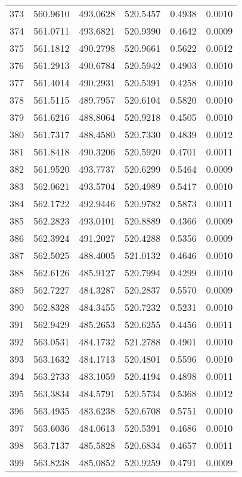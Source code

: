 \documentclass{article}
\begin{document}
\begin{longtable}{|c|c|c|c|c|c|}
373 & 560.9610 & 493.0628 & 520.5457 & 0.4938 & 0.0010 \\
374 & 561.0711 & 493.6821 & 520.9390 & 0.4642 & 0.0009 \\
375 & 561.1812 & 490.2798 & 520.9661 & 0.5622 & 0.0012 \\
376 & 561.2913 & 490.6784 & 520.5942 & 0.4903 & 0.0010 \\
377 & 561.4014 & 490.2931 & 520.5391 & 0.4258 & 0.0010 \\
378 & 561.5115 & 489.7957 & 520.6104 & 0.5820 & 0.0010 \\
379 & 561.6216 & 488.8064 & 520.9218 & 0.4505 & 0.0010 \\
380 & 561.7317 & 488.4580 & 520.7330 & 0.4839 & 0.0012 \\
381 & 561.8418 & 490.3206 & 520.5920 & 0.4701 & 0.0011 \\
382 & 561.9520 & 493.7737 & 520.6299 & 0.5464 & 0.0009 \\
383 & 562.0621 & 493.5704 & 520.4989 & 0.5417 & 0.0010 \\
384 & 562.1722 & 492.9446 & 520.9782 & 0.5873 & 0.0011 \\
385 & 562.2823 & 493.0101 & 520.8889 & 0.4366 & 0.0009 \\
386 & 562.3924 & 491.2027 & 520.4288 & 0.5356 & 0.0009 \\
387 & 562.5025 & 488.4005 & 521.0132 & 0.4646 & 0.0010 \\
388 & 562.6126 & 485.9127 & 520.7994 & 0.4299 & 0.0010 \\
389 & 562.7227 & 484.3287 & 520.2837 & 0.5570 & 0.0009 \\
390 & 562.8328 & 484.3455 & 520.7232 & 0.5231 & 0.0010 \\
391 & 562.9429 & 485.2653 & 520.6255 & 0.4456 & 0.0011 \\
392 & 563.0531 & 484.1732 & 521.2788 & 0.4901 & 0.0010 \\
393 & 563.1632 & 484.1713 & 520.4801 & 0.5596 & 0.0010 \\
394 & 563.2733 & 483.1059 & 520.4194 & 0.4898 & 0.0011 \\
395 & 563.3834 & 484.5791 & 520.5734 & 0.5368 & 0.0012 \\
396 & 563.4935 & 483.6238 & 520.6708 & 0.5751 & 0.0010 \\
397 & 563.6036 & 484.0613 & 520.5391 & 0.4686 & 0.0010 \\
398 & 563.7137 & 485.5828 & 520.6834 & 0.4657 & 0.0011 \\
399 & 563.8238 & 485.0852 & 520.9259 & 0.4791 & 0.0009 \\

\end{longtable}
\end{document}
